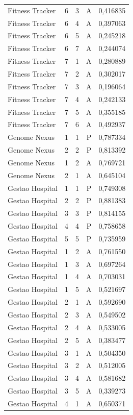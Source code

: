 \begin{longtable}{lrrrr}
Fitness Tracker & 6 & 3 & A & 0,416835 \\
Fitness Tracker & 6 & 4 & A & 0,397063 \\
Fitness Tracker & 6 & 5 & A & 0,245218 \\
Fitness Tracker & 6 & 7 & A & 0,244074 \\
Fitness Tracker & 7 & 1 & A & 0,280889 \\
Fitness Tracker & 7 & 2 & A & 0,302017 \\
Fitness Tracker & 7 & 3 & A & 0,196064 \\
Fitness Tracker & 7 & 4 & A & 0,242133 \\
Fitness Tracker & 7 & 5 & A & 0,355185 \\
Fitness Tracker & 7 & 6 & A & 0,492937 \\
Genome Nexus & 1 & 1 & P & 0,787334 \\
Genome Nexus & 2 & 2 & P & 0,813392 \\
Genome Nexus & 1 & 2 & A & 0,769721 \\
Genome Nexus & 2 & 1 & A & 0,645104 \\
Gestao Hospital & 1 & 1 & P & 0,749308 \\
Gestao Hospital & 2 & 2 & P & 0,881383 \\
Gestao Hospital & 3 & 3 & P & 0,814155 \\
Gestao Hospital & 4 & 4 & P & 0,758658 \\
Gestao Hospital & 5 & 5 & P & 0,735959 \\
Gestao Hospital & 1 & 2 & A & 0,761550 \\
Gestao Hospital & 1 & 3 & A & 0,697264 \\
Gestao Hospital & 1 & 4 & A & 0,703031 \\
Gestao Hospital & 1 & 5 & A & 0,521697 \\
Gestao Hospital & 2 & 1 & A & 0,592690 \\
Gestao Hospital & 2 & 3 & A & 0,549502 \\
Gestao Hospital & 2 & 4 & A & 0,533005 \\
Gestao Hospital & 2 & 5 & A & 0,383477 \\
Gestao Hospital & 3 & 1 & A & 0,504350 \\
Gestao Hospital & 3 & 2 & A & 0,512005 \\
Gestao Hospital & 3 & 4 & A & 0,581682 \\
Gestao Hospital & 3 & 5 & A & 0,339273 \\
Gestao Hospital & 4 & 1 & A & 0,650371 \\

\end{longtable}
